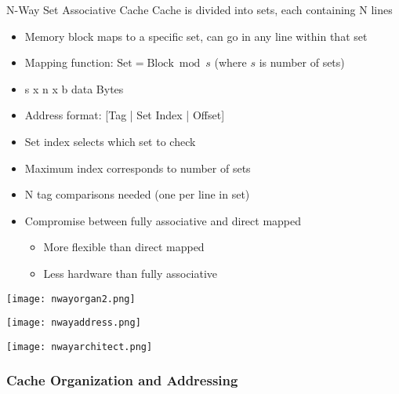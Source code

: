\begin{concept}{N-Way Set Associative Cache}
    Cache is divided into sets, each containing N lines
\begin{itemize}
    \item Memory block maps to a specific set, can go in any line within that set
    \item Mapping function: $\text{Set} = \text{Block} \bmod s$ (where $s$ is number of sets)
    \item s x n x b data Bytes
    \item Address format: [Tag | Set Index | Offset]
    \item Set index selects which set to check
    \item Maximum index corresponds to number of sets
    \item N tag comparisons needed (one per line in set)
    \item Compromise between fully associative and direct mapped 
    \begin{itemize}
        \item More flexible than direct mapped
        \item Less hardware than fully associative
    \end{itemize}
\end{itemize}

\begin{center}
    \texttt{[image: nwayorgan2.png]}

\texttt{[image: nwayaddress.png]}



\texttt{[image: nwayarchitect.png]}
\end{center}
\end{concept}






\subsubsection{Cache Organization and Addressing}






